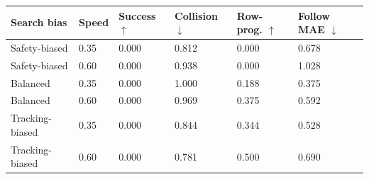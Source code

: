 \begin{tabular}{llllll}
\toprule
Search bias & Speed & Success $\uparrow$ & Collision $\downarrow$ & Row-prog. $\uparrow$ & Follow MAE $\downarrow$ \\
\midrule
Safety-biased & 0.35 & 0.000 & 0.812 & 0.000 & 0.678 \\
Safety-biased & 0.60 & 0.000 & 0.938 & 0.000 & 1.028 \\
Balanced & 0.35 & 0.000 & 1.000 & 0.188 & 0.375 \\
Balanced & 0.60 & 0.000 & 0.969 & 0.375 & 0.592 \\
Tracking-biased & 0.35 & 0.000 & 0.844 & 0.344 & 0.528 \\
Tracking-biased & 0.60 & 0.000 & 0.781 & 0.500 & 0.690 \\
\bottomrule
\end{tabular}
